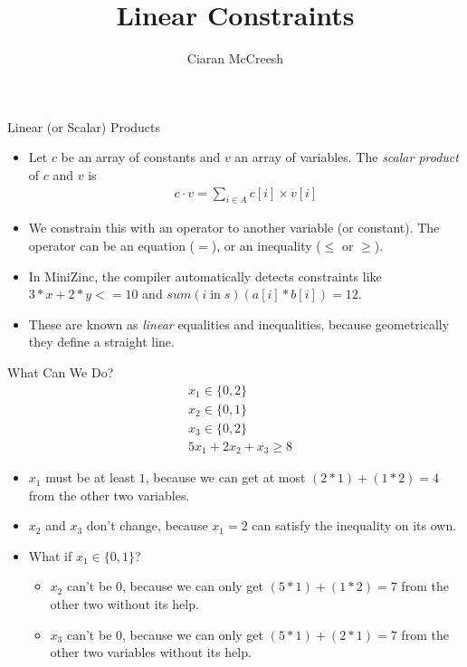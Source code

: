\documentclass{beamer}
\title{Linear Constraints}
\author{Ciaran McCreesh}
\begin{document}
{
    \begin{frame}
        \titlepage
    \end{frame}
}

\begin{frame}{Linear (or Scalar) Products}
    \begin{itemize}
        \item Let $c$ be an array of constants and $v$ an array of variables. The \emph{scalar
            product} of $c$ and $v$ is \begin{align*}
        c \cdot v = \sum_{i \in A}{c[i] \times v[i]}\end{align*}
        \item We constrain this with an operator to another variable (or constant). The operator can
            be an equation ($=$), or an inequality ($\le$ or $\ge$).
        \item In MiniZinc, the compiler automatically detects constraints like $3 * x + 2 * y <= 10$
            and $sum(i \operatorname{in} s)(a[i] * b[i]) = 12$.
        \item These are known as \emph{linear} equalities and inequalities, because
            geometrically they define a straight line.
    \end{itemize}
\end{frame}

\begin{frame}{What Can We Do?}
    \vspace*{-1em}
    \begin{align*}
        & x_1 \in \{ 0, 2 \} \\
        & x_2 \in \{ 0, 1 \} \\
        & x_3 \in \{ 0, 2 \} \\
        & 5x_1 + 2x_2 + x_3 \ge 8
    \end{align*}

    \begin{itemize}
        \item <2-> $x_1$ must be at least $1$, because we can get at most $(2 *
            1) + (1 * 2) = 4$ from the other two variables.
        \item <3-> $x_2$ and $x_3$ don't change, because $x_1 = 2$ can satisfy the inequality on its own.
        \item <4-> What if $x_1 \in \{ 0, 1 \}$?
            \begin{itemize}
            \item <5-> $x_2$ can't be $0$, because we can only get $(5 * 1) + (1 * 2) = 7$ from the other two
                without its help.
            \item <6-> $x_3$ can't be $0$, because we can only get $(5 * 1) + (2 * 1) = 7$ from the other two
                variables without its help.
            \end{itemize}
    \end{itemize}
\end{frame}
\end{document}

